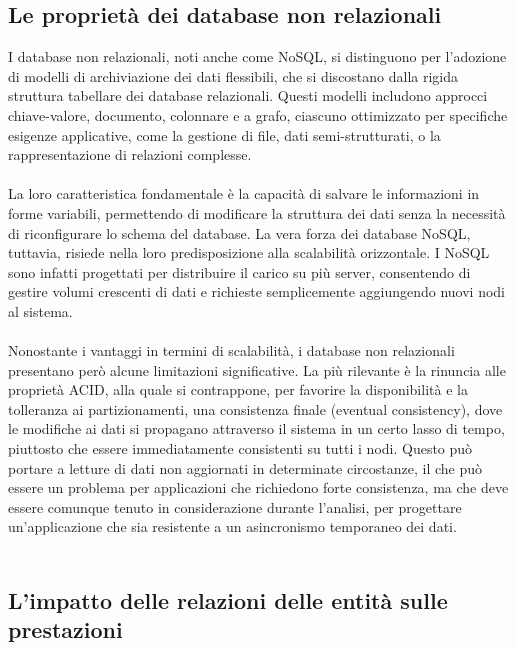 \subsection {Le proprietà dei database non relazionali}

I database non relazionali, noti anche come NoSQL,
si distinguono per l'adozione di modelli di archiviazione dei dati flessibili,
che si discostano dalla rigida struttura tabellare dei database relazionali.
Questi modelli includono approcci chiave-valore, documento, colonnare e a grafo,
ciascuno ottimizzato per specifiche esigenze applicative,
come la gestione di file, dati semi-strutturati, o la rappresentazione di relazioni complesse.\\
\\
La loro caratteristica fondamentale è la capacità di salvare le informazioni in forme variabili,
permettendo di modificare la struttura dei dati senza la necessità di riconfigurare lo schema del database.
La vera forza dei database NoSQL, tuttavia, risiede nella loro predisposizione alla scalabilità orizzontale.
I NoSQL sono infatti progettati per distribuire il carico su più server,
consentendo di gestire volumi crescenti di dati e richieste semplicemente aggiungendo nuovi nodi al sistema.\\
\\
Nonostante i vantaggi in termini di scalabilità,
i database non relazionali presentano però alcune limitazioni significative.
La più rilevante è la rinuncia alle proprietà ACID, alla quale si contrappone,
per favorire la disponibilità e la tolleranza ai partizionamenti,
una consistenza finale (eventual consistency),
dove le modifiche ai dati si propagano attraverso il sistema in un certo lasso di tempo,
piuttosto che essere immediatamente consistenti su tutti i nodi.
Questo può portare a letture di dati non aggiornati in determinate circostanze,
il che può essere un problema per applicazioni che richiedono forte consistenza,
ma che deve essere comunque tenuto in considerazione durante l'analisi,
per progettare un'applicazione che sia resistente a un asincronismo temporaneo dei dati.\\
\\





\subsection{L'impatto delle relazioni delle entità sulle prestazioni}

